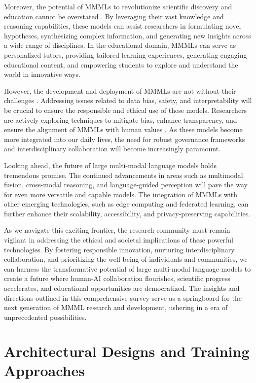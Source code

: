 \documentclass[11pt]{article}
\begin{document}
Moreover, the potential of MMMLs to revolutionize scientific discovery and education cannot be overstated \cite{ref109,ref110}. By leveraging their vast knowledge and reasoning capabilities, these models can assist researchers in formulating novel hypotheses, synthesizing complex information, and generating new insights across a wide range of disciplines. In the educational domain, MMMLs can serve as personalized tutors, providing tailored learning experiences, generating engaging educational content, and empowering students to explore and understand the world in innovative ways.

However, the development and deployment of MMMLs are not without their challenges \cite{ref111}. Addressing issues related to data bias, safety, and interpretability will be crucial to ensure the responsible and ethical use of these models. Researchers are actively exploring techniques to mitigate bias, enhance transparency, and ensure the alignment of MMMLs with human values \cite{ref14}. As these models become more integrated into our daily lives, the need for robust governance frameworks and interdisciplinary collaboration will become increasingly paramount.

Looking ahead, the future of large multi-modal language models holds tremendous promise. The continued advancements in areas such as multimodal fusion, cross-modal reasoning, and language-guided perception \cite{ref15} will pave the way for even more versatile and capable models. The integration of MMMLs with other emerging technologies, such as edge computing and federated learning, can further enhance their scalability, accessibility, and privacy-preserving capabilities.

As we navigate this exciting frontier, the research community must remain vigilant in addressing the ethical and societal implications of these powerful technologies. By fostering responsible innovation, nurturing interdisciplinary collaboration, and prioritizing the well-being of individuals and communities, we can harness the transformative potential of large multi-modal language models to create a future where human-AI collaboration flourishes, scientific progress accelerates, and educational opportunities are democratized. The insights and directions outlined in this comprehensive survey serve as a springboard for the next generation of MMML research and development, ushering in a era of unprecedented possibilities.

\section{Architectural Designs and Training Approaches}
\end{document}
